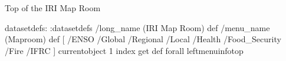 Top of the IRI Map Room
\begin{ingrid}
datasetdefs:
:datasetdefs
/long_name (IRI Map Room) def
/menu_name (Maproom) def
[ /ENSO /Global /Regional /Local /Health /Food_Security /Fire /IFRC ]
{ currentobject 1 index get  def} forall
leftmenuinfotop
\end{ingrid}
